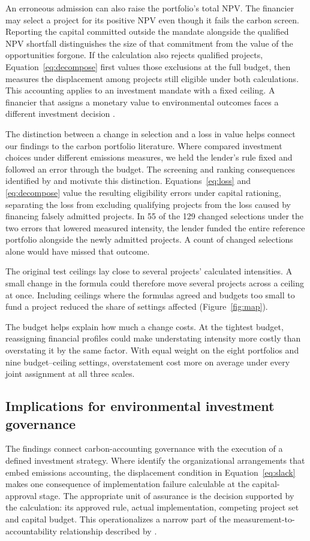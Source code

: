 An erroneous admission can also raise the portfolio's total NPV. The financier may select a project for its positive NPV even though it fails the carbon screen. Reporting the capital committed outside the mandate alongside the qualified NPV shortfall distinguishes the size of that commitment from the value of the opportunities forgone. If the calculation also rejects qualified projects, Equation~\eqref{eq:decompose} first values those exclusions at the full budget, then measures the displacement among projects still eligible under both calculations. This accounting applies to an investment mandate with a fixed ceiling. A financier that assigns a monetary value to environmental outcomes faces a different investment decision \citep{schoenmaker}.

The distinction between a change in selection and a loss in value helps connect our findings to the carbon portfolio literature. Where \citet{anquetin} compared investment choices under different emissions measures, we held the lender's rule fixed and followed an error through the budget. The screening and ranking consequences identified by \citet{gurvich2021} and \citet{bajic2023} motivate this distinction. Equations~\eqref{eq:loss} and \eqref{eq:decompose} value the resulting eligibility errors under capital rationing, separating the loss from excluding qualifying projects from the loss caused by financing falsely admitted projects. In 55 of the 129 changed selections under the two errors that lowered measured intensity, the lender funded the entire reference portfolio alongside the newly admitted projects. A count of changed selections alone would have missed that outcome.

The original test ceilings lay close to several projects' calculated intensities. A small change in the formula could therefore move several projects across a ceiling at once. Including ceilings where the formulas agreed and budgets too small to fund a project reduced the share of settings affected (Figure~\ref{fig:map}).

The budget helps explain how much a change costs. At the tightest budget, reassigning financial profiles could make understating intensity more costly than overstating it by the same factor. With equal weight on the eight portfolios and nine budget--ceiling settings, overstatement cost more on average under every joint assignment at all three scales.

\subsection{Implications for environmental investment governance}
The findings connect carbon-accounting governance with the execution of a defined investment strategy. Where \citet{ruan2026} identify the organizational arrangements that embed emissions accounting, the displacement condition in Equation~\eqref{eq:slack} makes one consequence of implementation failure calculable at the capital-approval stage. The appropriate unit of assurance is the decision supported by the calculation: its approved rule, actual implementation, competing project set and capital budget. This operationalizes a narrow part of the measurement-to-accountability relationship described by \citet{tian2026}.

